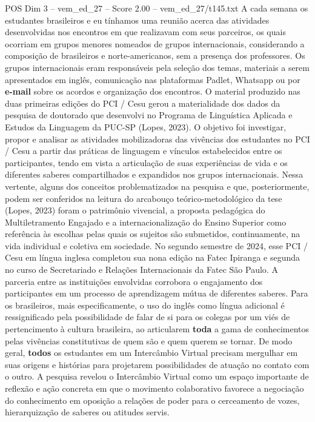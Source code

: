 \begin{textsample}{POS Dim 3 – vem\_ed\_27 – Score 2.00 – vem\_ed\_27/t145.txt}
A cada semana os estudantes brasileiros e eu tínhamos uma reunião acerca das atividades desenvolvidas nos encontros em que realizavam com seus parceiros, os quais ocorriam em grupos menores nomeados de grupos internacionais, considerando a composição de brasileiros e norte-americanos, sem a presença dos professores.
Os grupos internacionais eram responsáveis pela seleção dos temas, materiais a serem apresentados em inglês, comunicação nas plataformas Padlet, Whatsapp ou por \textbf{e-mail} sobre os acordos e organização dos encontros.
O material produzido nas duas primeiras edições do PCI / Cesu gerou a materialidade dos dados da pesquisa de doutorado que desenvolvi no Programa de Linguística Aplicada e Estudos da Linguagem da PUC-SP (Lopes, 2023).
O objetivo foi investigar, propor e analisar as atividades mobilizadoras das vivências dos estudantes no PCI / Cesu a partir das práticas de linguagem e vínculos estabelecidos entre os participantes, tendo em vista a articulação de suas experiências de vida e os diferentes saberes compartilhados e expandidos nos grupos internacionais.
Nessa vertente, alguns dos conceitos problematizados na pesquisa e que, posteriormente, podem ser conferidos na leitura do arcabouço teórico-metodológico da tese (Lopes, 2023) foram o patrimônio vivencial, a proposta pedagógica do Multiletramento Engajado e a internacionalização do Ensino Superior como referência às escolhas pelas quais os sujeitos são submetidos, continuamente, na vida individual e coletiva em sociedade.
No segundo semestre de 2024, esse PCI / Cesu em língua inglesa completou sua nona edição na Fatec Ipiranga e segunda no curso de Secretariado e Relações Internacionais da Fatec São Paulo.
A parceria entre as instituições envolvidas corrobora o engajamento dos participantes em um processo de aprendizagem mútua de diferentes saberes.
Para os brasileiros, mais especificamente, o uso do inglês como língua adicional é ressignificado pela possibilidade de falar de si para os colegas por um viés de pertencimento à cultura brasileira, ao articularem \textbf{toda} a gama de conhecimentos pelas vivências constitutivas de quem são e quem querem se tornar.
De modo geral, \textbf{todos} os estudantes em um Intercâmbio Virtual precisam mergulhar em suas origens e histórias para projetarem possibilidades de atuação no contato com o outro.
A pesquisa revelou o Intercâmbio Virtual como um espaço importante de reflexão e ação concreta em que o movimento colaborativo favorece a negociação do conhecimento em oposição a relações de poder para o cerceamento de vozes, hierarquização de saberes ou atitudes servis.

\end{textsample}
